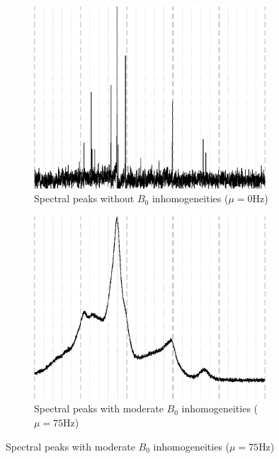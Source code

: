\begin{figure}
    \centering
    \begin{subfigure}{0.32\textwidth}
        \centering
        \includegraphics[width=0.95\textwidth,keepaspectratio]{images/b0_peaks/no_B0.eps}
        \caption{Spectral peaks without $B_0$ inhomogeneities ($\mu = 0$Hz)}
        \label{subfig:without B0}        
    \end{subfigure}
    \begin{subfigure}{0.32\textwidth}
        \centering
        \includegraphics[width=0.95\textwidth,keepaspectratio]{images/b0_peaks/some_B0.eps}
        \caption{Spectral peaks with moderate $B_0$ inhomogeneities ($\mu = 75$Hz)}
        \label{subfig:some B0}        

\end{subfigure}
\end{figure}
